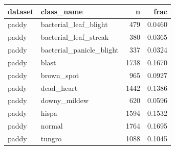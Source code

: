 \begin{tabular}{llrr}
\toprule
dataset & class\_name & n & frac \\
\midrule
paddy & bacterial\_leaf\_blight & 479 & 0.0460 \\
paddy & bacterial\_leaf\_streak & 380 & 0.0365 \\
paddy & bacterial\_panicle\_blight & 337 & 0.0324 \\
paddy & blast & 1738 & 0.1670 \\
paddy & brown\_spot & 965 & 0.0927 \\
paddy & dead\_heart & 1442 & 0.1386 \\
paddy & downy\_mildew & 620 & 0.0596 \\
paddy & hispa & 1594 & 0.1532 \\
paddy & normal & 1764 & 0.1695 \\
paddy & tungro & 1088 & 0.1045 \\
\bottomrule
\end{tabular}
